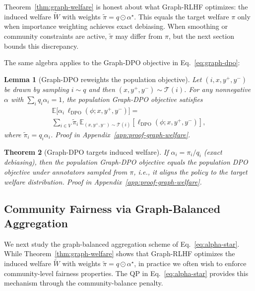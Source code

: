 \documentclass{article}
\theoremstyle{plain}
\newtheorem{theorem}{Theorem}[section]
\newtheorem{lemma}[theorem]{Lemma}
\theoremstyle{definition}
\theoremstyle{remark}
\begin{document}
Theorem~\ref{thm:graph-welfare} is honest about what Graph-RLHF optimizes:
the induced welfare $\widetilde{W}$ with weights
$\tilde\pi = q \odot \alpha^\star$. This equals the target welfare $\pi$
only when importance weighting achieves exact debiasing. When
smoothing or community constraints are active, $\tilde\pi$ may differ from
$\pi$, but the next section bounds this discrepancy.

The same algebra applies to the Graph-DPO objective in
Eq.~\eqref{eq:graph-dpo}:

\begin{lemma}[Graph-DPO reweights the population objective]
\label{lem:graph-dpo-reweight}
Let $(i, x, y^+, y^-)$ be drawn by sampling $i \sim q$ and then
$(x, y^+, y^-) \sim \mathcal{T}(i)$. For any nonnegative $\alpha$ with
$\sum_i q_i \alpha_i = 1$, the population Graph-DPO objective satisfies
\begin{equation}
\begin{aligned}
    \mathbb{E}\big[\alpha_i \, \ell_{\mathrm{DPO}}(\phi; x, y^+, y^-)\big]
    = \qquad\qquad\qquad \\
    \sum_{i \in V} \tilde\pi_i \,
    \mathbb{E}_{(x,y^+,y^-) \sim \mathcal{T}(i)}
    [\ell_{\mathrm{DPO}}(\phi; x, y^+, y^-)],
\end{aligned}
\end{equation}
where $\tilde\pi_i = q_i \alpha_i$. Proof in Appendix~\ref{app:proof-graph-welfare}.
\end{lemma}

\begin{theorem}[Graph-DPO targets induced welfare]
\label{thm:graph-dpo-welfare}
If $\alpha_i = \pi_i / q_i$ (exact debiasing), then the population
Graph-DPO objective equals the population DPO objective under annotators
sampled from $\pi$, i.e., it aligns the policy to the target welfare
distribution. Proof in Appendix~\ref{app:proof-graph-welfare}.
\end{theorem}

\subsection{Community Fairness via Graph-Balanced Aggregation}
\label{subsec:theory-fairness}

We next study the graph-balanced aggregation scheme of
Eq.~\eqref{eq:alpha-star}. While Theorem~\ref{thm:graph-welfare} shows that
Graph-RLHF optimizes the induced welfare $\widetilde{W}$ with weights
$\tilde\pi = \hat q \odot \alpha^\star$, in practice we often wish to enforce
community-level fairness properties. The QP in Eq.~\eqref{eq:alpha-star}
provides this mechanism through the community-balance penalty.
\end{document}
